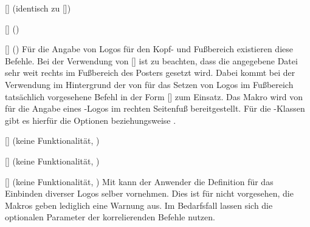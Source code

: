 \begin{DeclareEntity}{}
\begin{Declaration}
  {[]}
  (identisch zu [])
\begin{Declaration}
  {[]}
  ()
\begin{Declaration}
  {[]}
  ()
\printdeclarationlist
%
Für die Angabe von Logos für den Kopf- und Fußbereich existieren diese Befehle. 
Bei der Verwendung von [] ist zu 
beachten, dass die angegebene Datei sehr weit rechts im Fußbereich des Posters 
gesetzt wird. Dabei kommt bei der Verwendung im Hintergrund der von \TUDScript 
für das Setzen von Logos im Fußbereich tatsächlich vorgesehene Befehl in der 
Form []
zum Einsatz. Das Makro  wird von  für 
die Angabe eines \DDC-Logos im rechten Seitenfuß bereitgestellt. Für die 
\TUDScript-Klassen gibt es hierfür die Optionen  beziehungsweise 
.
\end{Declaration}
\end{Declaration}
\end{Declaration}

\begin{Declaration}
  {[]}
  (keine Funktionalität, )
\begin{Declaration}
  {[]}
  (keine Funktionalität, )
\begin{Declaration}
  {[]}
  (keine Funktionalität, )
\printdeclarationlist
%
Mit  kann der Anwender die Definition für das Einbinden 
diverser Logos selber vornehmen. Dies ist für \TUDScript nicht vorgesehen, 
die Makros geben lediglich eine Warnung aus. Im Bedarfsfall lassen sich die 
optionalen Parameter der korrelierenden Befehle nutzen. 
\end{Declaration}
\end{Declaration}
\end{Declaration}


\end{DeclareEntity}
